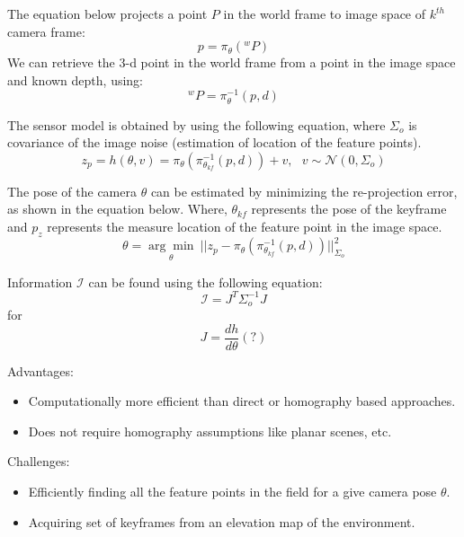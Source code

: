 \documentclass[conference]{IEEEtran}
\begin{document}
The equation below projects a point $P$ in the world frame to image space of $k^{th}$ camera frame:
\begin{equation} p=\pi_\theta(^{w}P) \end{equation}
We can retrieve the 3-d point in the world frame from a point in the image space and known depth, using: 
\begin{equation} ^{w}P=\pi^{-1}_\theta(p,d) \end{equation}

The sensor model is obtained by using the following equation, where $\Sigma_o$ is covariance of the image noise (estimation of location of the feature points).
\begin{equation}
     z_p = h(\theta,v)=
     \pi_\theta(\pi^{-1}_{\theta_{kf}}(p,d)) + v,~~~ v\sim \mathcal{N}(0,\Sigma_{o})
\end{equation}


The pose of the camera $\theta$ can be estimated by minimizing the re-projection error, as shown in the equation below. Where, $\theta_{kf}$ represents the pose of the keyframe and $p_z$ represents the measure location of the feature point in the image space.
\begin{equation}
     \theta = \underset{\theta}{\arg\min}~||z_p - \pi_\theta(\pi^{-1}_{\theta_{kf}}(p,d))||^2_{\Sigma_o}
\end{equation}

Information $\mathcal{I}$ can be found using the following equation:
\begin{equation}
     \mathcal{I} = J^{T}\Sigma^{-1}_{o}J
\end{equation}
for
\begin{equation}
     J = \frac{dh}{d\theta}(?)
\end{equation}

Advantages:
\begin{itemize}
    \item Computationally more efficient than direct or homography based approaches.
    \item Does not require homography assumptions like planar scenes, etc.
\end{itemize}

Challenges:
\begin{itemize}
    \item Efficiently finding all the feature points in the field for a give camera pose $\theta$.
    \item Acquiring set of keyframes from an elevation map of the environment.
\end{itemize}

\printbibliography
\end{document}
